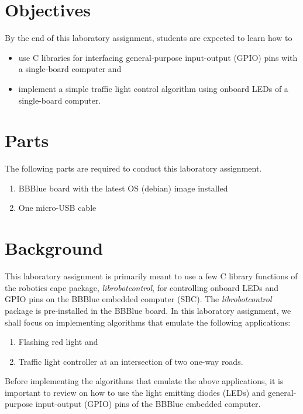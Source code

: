\section{Objectives}
By the end of this laboratory assignment, students are expected to learn how to 

\begin{itemize}

\item use C libraries for interfacing general-purpose input-output (GPIO) pins with a single-board computer and   
  
\item implement a simple traffic light control algorithm using onboard LEDs of a single-board computer.  
 
  
\end{itemize}

\section{Parts}
\label{sec:partsTLC}
The following parts are required to conduct this laboratory assignment. %
%
\begin{enumerate}
\item BBBlue board with the latest OS (debian) image installed
\item One micro-USB cable  
\end{enumerate}

\section{Background}
\label{sec:background}

This laboratory assignment is primarily meant to use a few C library functions
of the robotics cape package, \emph{librobotcontrol}, for controlling onboard
LEDs and GPIO pins on the BBBlue embedded computer (SBC). The \emph{librobotcontrol} package is pre-installed in the BBBlue board. In this laboratory assignment, we shall focus on implementing  algorithms that emulate the following applications:
%
\begin{enumerate}
    \item Flashing red light and 
    \item Traffic light controller at an intersection of two one-way roads.
\end{enumerate}
%
Before implementing the algorithms that emulate the above applications, it is important to review on how to use the light emitting diodes (LEDs) and general-purpose input-output (GPIO) pins of the BBBlue embedded computer. 

